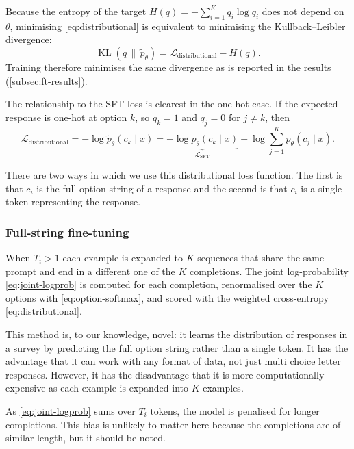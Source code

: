 \noindent Because the entropy of the target $H(q) = -\sum_{i=1}^{K} q_i \log q_i$ does not depend on $\theta$, minimising \eqref{eq:distributional} is equivalent to minimising the Kullback--Leibler divergence:
\begin{equation}
    \operatorname{KL}(q \,\|\, \tilde{p}_\theta)
    = \mathcal{L}_{\mathrm{distributional}} - H(q).
    \label{eq:dist-kl}
\end{equation}
\noindent Training therefore minimises the same divergence as is reported in the results (\ref{subsec:ft-results}).

The relationship to the SFT loss is clearest in the one-hot case. If the expected response is one-hot at option $k$, so $q_k = 1$ and $q_j = 0$ for $j \neq k$, then
\begin{equation}
    \mathcal{L}_{\mathrm{distributional}}
    = -\log\tilde{p}_\theta(c_k \mid x)
    = \underbrace{-\log p_\theta(c_k \mid x)}_{\mathcal{L}_{\mathrm{SFT}}}
    + \log \sum_{j=1}^{K} p_\theta(c_j \mid x).
    \label{eq:dist-onehot}
\end{equation}

There are two ways in which we use this distributional loss function. The first is that $c_i$ is the full option string of a response and the second is that $c_i$ is a single token representing the response.


\subsubsection{Full-string fine-tuning}

When $T_i>1$ each example is expanded to $K$ sequences that share the same prompt and end in a different one of the $K$ completions. The joint log-probability \eqref{eq:joint-logprob} is computed for each completion, renormalised over the $K$ options with \eqref{eq:option-softmax}, and scored with the weighted cross-entropy \eqref{eq:distributional}.

This method is, to our knowledge, novel: it learns the distribution of responses in a survey by predicting the full option string rather than a single token. It has the advantage that it can work with any format of data, not just multi choice letter responses. However, it has the disadvantage that it is more computationally expensive as each example is expanded into $K$ examples.

As \eqref{eq:joint-logprob} sums over $T_i$ tokens, the model is penalised for longer completions. This bias is unlikely to matter here because the completions are of similar length, but it should be noted.


